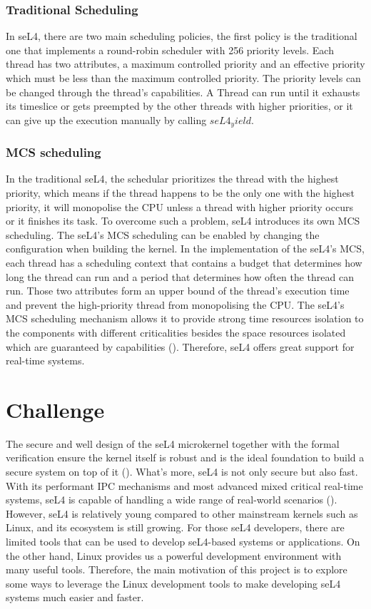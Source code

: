 \subsubsection{Traditional Scheduling}

In seL4, there are two main scheduling policies, the first policy is the traditional one that implements a round-robin scheduler with 256 priority levels. Each thread has two attributes, a maximum controlled priority and an effective priority which must be less than the maximum controlled priority. The priority levels can be changed through the thread's capabilities. A Thread can run until it exhausts its timeslice or gets preempted by the other threads with higher priorities, or it can give up the execution manually by calling $seL4_yield$.

\subsubsection{MCS scheduling}

In the traditional seL4, the schedular prioritizes the thread with the highest priority, which means if the thread happens to be the only one with the highest priority, it will monopolise the CPU unless a thread with higher priority occurs or it finishes its task. To overcome such a problem, seL4 introduces its own MCS scheduling. The seL4's MCS scheduling can be enabled by changing the configuration when building the kernel. In the implementation of the seL4's MCS, each thread has a scheduling context that contains a budget that determines how long the thread can run and a period that determines how often the thread can run. Those two attributes form an upper bound of the thread's execution time and prevent the high-priority thread from monopolising the CPU. The seL4's MCS scheduling mechanism allows it to provide strong time resources isolation to the components with different criticalities besides the space resources isolated which are guaranteed by capabilities (\cite{Lyons_MAH_18}). Therefore, seL4 offers great support for real-time systems.

\section{Challenge}

The secure and well design of the seL4 microkernel together with the formal verification ensure the kernel itself is robust and is the ideal foundation to build a secure system on top of it (\cite{Klein_AEHCDEEKNSTW_10}). What's more, seL4 is not only secure but also fast. With its performant IPC mechanisms and most advanced mixed critical real-time systems, seL4 is capable of handling a wide range of real-world scenarios (\cite{Heiser_KA_20}). However, seL4 is relatively young compared to other mainstream kernels such as Linux, and its ecosystem is still growing. For those seL4 developers, there are limited tools that can be used to develop seL4-based systems or applications. On the other hand, Linux provides us a powerful development environment with many useful tools. Therefore, the main motivation of this project is to explore some ways to leverage the Linux development tools to make developing seL4 systems much easier and faster.

